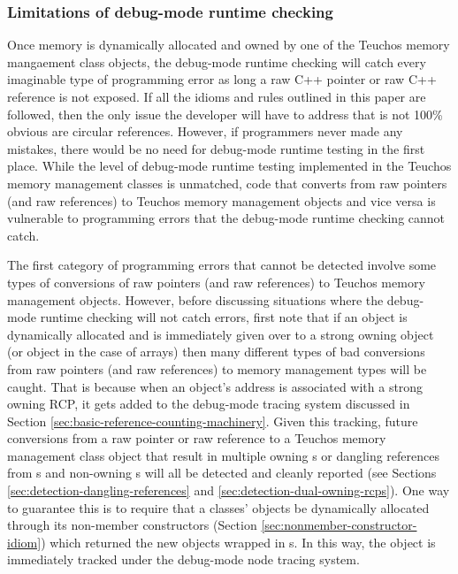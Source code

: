 \documentclass[pdf,ps2pdf,11pt]{SANDreport}
\begin{document}
%
{}\subsubsection{Limitations of debug-mode runtime checking}
\label{sec:limitations-debug-mode-checking}
%

Once memory is dynamically allocated and owned by one of the Teuchos
memory mangaement class objects, the debug-mode runtime checking will
catch every imaginable type of programming error as long a raw C++
pointer or raw C++ reference is not exposed.  If all the idioms and
rules outlined in this paper are followed, then the only issue the
developer will have to address that is not 100\% obvious are circular
references.  However, if programmers never made any mistakes, there
would be no need for debug-mode runtime testing in the first place.
While the level of debug-mode runtime testing implemented in the
Teuchos memory management classes is unmatched, code that converts
from raw pointers (and raw references) to Teuchos memory management
objects and vice versa is vulnerable to programming errors that the
debug-mode runtime checking cannot catch.

The first category of programming errors that cannot be detected
involve some types of conversions of raw pointers (and raw references)
to Teuchos memory management objects.  However, before discussing
situations where the debug-mode runtime checking will not catch
errors, first note that if an object is dynamically allocated and is
immediately given over to a strong owning {} object (or
{} object in the case of arrays) then many different
types of bad conversions from raw pointers (and raw references) to
memory management types will be caught.  That is because when an
object's address is associated with a strong owning RCP, it gets added
to the debug-mode {} tracing system discussed in Section
{}\ref{sec:basic-reference-counting-machinery}.  Given this tracking,
future conversions from a raw pointer or raw reference to a Teuchos
memory management class object that result in multiple owning
{}s or dangling references from {}s and non-owning
{}s will all be detected and cleanly reported (see Sections
{}\ref{sec:detection-dangling-references} and
{}\ref{sec:detection-dual-owning-rcps}).  One way to guarantee this is
to require that a classes' objects be dynamically allocated through
its non-member constructors (Section
{}\ref{sec:nonmember-constructor-idiom}) which returned the new
objects wrapped in {}s.  In this way, the object is
immediately tracked under the debug-mode node tracing system.
\end{document}
